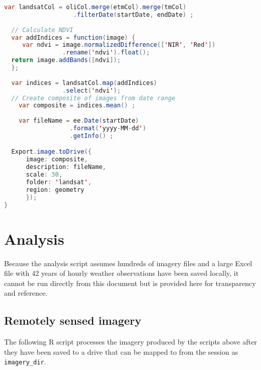\documentclass[
]{article}
\begin{document}
\begin{lstlisting}[language=Java]
  var landsatCol = oliCol.merge(etmCol).merge(tmCol)
                   .filterDate(startDate, endDate) ;
  
  // Calculate NDVI 
  var addIndices = function(image) {
     var ndvi = image.normalizedDifference(['NIR', 'Red'])
                .rename('ndvi').float();
  return image.addBands([ndvi]);
  };
  
  var indices = landsatCol.map(addIndices) 
                .select('ndvi');
  // Create composite of images from date range
    var composite = indices.mean() ; 
  
    var fileName = ee.Date(startDate) 
                  .format('yyyy-MM-dd')
                  .getInfo() ;

  Export.image.toDrive({
      image: composite,
      description: fileName,
      scale: 30,
      folder: 'landsat', 
      region: geometry
      });
}
\end{lstlisting}

\newpage

\section{Analysis}\label{analysis}

Because the analysis script assumes hundreds of imagery files and a
large Excel file with 42 years of hourly weather observations have been
saved locally, it cannot be run directly from this document but is
provided here for transparency and reference.

\subsection{Remotely sensed imagery} 

The following \textsf{R} script processes the imagery produced by the scripts above after they have been saved to a drive that can be mapped to from the session as \texttt{imagery\_dir}. 
\end{document}
